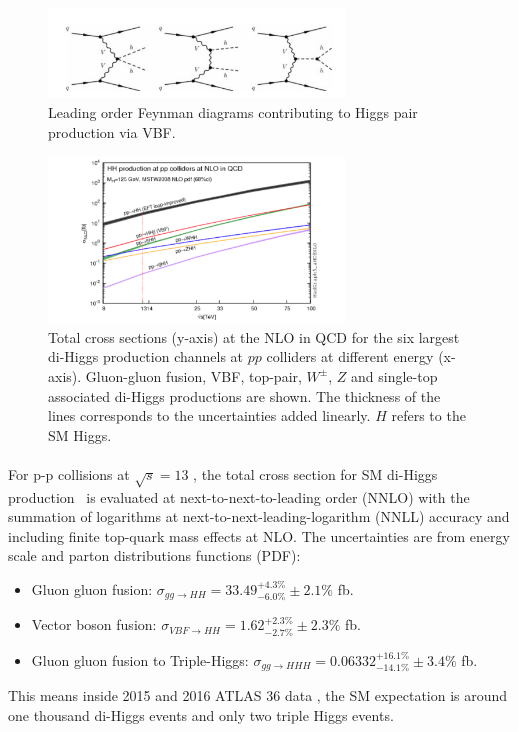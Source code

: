 \begin{figure}[htbp!]
  \centering
  \captionsetup{justification=centering}
  \includegraphics[width=0.7\textwidth]{figures/theory/SM_HH_VBF}
  \caption{Leading order Feynman diagrams contributing to Higgs pair production via VBF.}
  \label{fig:SM_HH_VBF}
\end{figure}

\begin{figure}[htbp!]
  \centering
  \captionsetup{justification=centering}
  \includegraphics[width=0.7\textwidth]{figures/theory/HH_xsec}
  \caption{Total cross sections (y-axis) at the NLO in QCD for the six largest di-Higgs production channels at $pp$ colliders at different energy (x-axis). Gluon-gluon fusion, VBF, top-pair, $W^{\pm}$, $Z$ and single-top associated di-Higgs productions are shown. The thickness of the lines corresponds to the uncertainties added linearly. $H$ refers to the SM Higgs.}
  \label{fig:SM_HH_xsec}
\end{figure}

\paragraph{}
\label{par:diHiggs-crosssection}
For p-p collisions at $\sqrt{s}=13$ \TeV, the total cross section for SM di-Higgs production~\cite{LHCYellow} is evaluated at next-to-next-to-leading order (NNLO) with the summation of logarithms at next-to-next-leading-logarithm (NNLL) accuracy and including finite top-quark mass effects at NLO. 
The uncertainties are from energy scale and parton distributions functions (PDF):
\begin{itemize}
  \item Gluon gluon fusion: $\sigma_{gg \to HH} = 33.49^{+ 4.3 \%}_{-6.0 \%} \pm 2.1\%$ fb. %
  \item Vector boson fusion: $\sigma_{VBF \to HH} = 1.62^{+ 2.3 \%}_{-2.7 \%} \pm 2.3\%$ fb.
  \item Gluon gluon fusion to Triple-Higgs: $\sigma_{gg \to HHH} = 0.06332 ^{+ 16.1 \%}_{-14.1 \%} \pm 3.4\% $ fb.
\end{itemize} 
This means inside 2015 and 2016 ATLAS 36 \ifb data , the SM expectation is around one thousand di-Higgs events and only two triple Higgs events.


